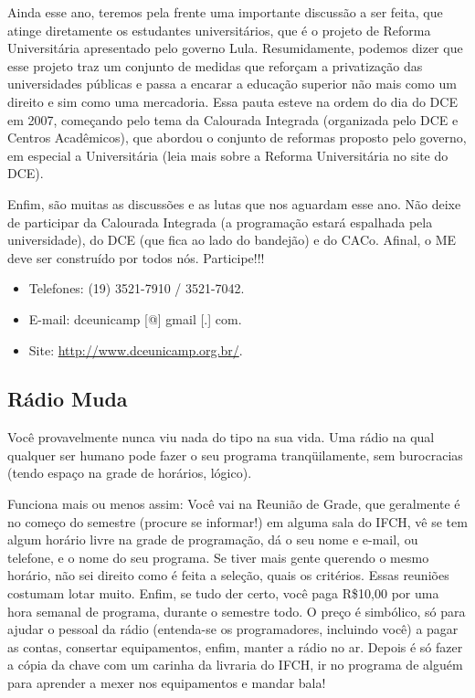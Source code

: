 Ainda esse ano, teremos pela frente uma importante discussão a ser feita, que
atinge diretamente os estudantes universitários, que é o projeto de Reforma
Universitária apresentado pelo governo Lula. Resumidamente, podemos dizer que
esse projeto traz um conjunto de medidas que reforçam a privatização das
universidades públicas e passa a encarar a educação superior não mais como um
direito e sim como uma mercadoria. Essa pauta esteve na ordem do dia do DCE em
2007, começando pelo tema da Calourada Integrada (organizada pelo DCE e Centros
Acadêmicos), que abordou o conjunto de reformas proposto pelo governo, em
especial a Universitária (leia mais sobre a Reforma Universitária no site do
DCE).

Enfim, são muitas as discussões e as lutas que nos aguardam esse ano. Não deixe
de participar da Calourada Integrada (a programação estará espalhada pela
universidade), do DCE (que fica ao lado do bandejão) e do CACo. Afinal, o ME
deve ser construído por todos nós. Participe!!!

\begin{itemize}
\item  Telefones: (19) 3521-7910 / 3521-7042.
\item  E-mail: dceunicamp [@] gmail [.] com.
\item  Site: \url{http://www.dceunicamp.org.br/}.
\end{itemize}

\subsection{Rádio Muda}

Você provavelmente nunca viu nada do tipo na sua vida. Uma rádio na qual
qualquer ser humano pode fazer o seu programa tranqüilamente, sem burocracias
(tendo espaço na grade de horários, lógico).

Funciona mais ou menos assim: Você vai na Reunião de Grade, que geralmente é no
começo do semestre (procure se informar!) em alguma sala do IFCH, vê se tem
algum horário livre na grade de programação, dá o seu nome e e-mail, ou
telefone, e o nome do seu programa. Se tiver mais gente querendo o mesmo
horário, não sei direito como é feita a seleção, quais os critérios. Essas
reuniões costumam lotar muito. Enfim, se tudo der certo, você paga R\$10,00 por
uma hora semanal de programa, durante o semestre todo. O preço é simbólico, só
para ajudar o pessoal da rádio (entenda-se os programadores, incluindo você)
a pagar as contas, consertar equipamentos, enfim, manter a rádio no ar. Depois
é só fazer a cópia da chave com um carinha da livraria do IFCH, ir no programa
de alguém para aprender a mexer nos equipamentos e mandar bala!


